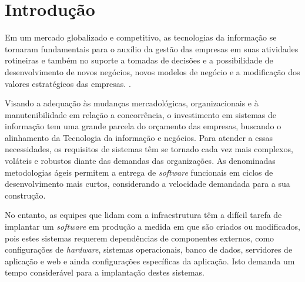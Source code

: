\section{\esp Introdução}

Em um mercado globalizado e competitivo, as tecnologias da informação se tornaram fundamentais para o auxílio da gestão das empresas em suas atividades rotineiras e também no suporte a tomadas de decisões e a possibilidade de desenvolvimento de novos negócios, novos modelos de negócio e a modificação dos valores estratégicos das empresas. \cite{audy}.

Visando a adequação às mudanças mercadológicas, organizacionais e à manutenibilidade em relação a concorrência, o investimento em sistemas de informação tem uma grande parcela do orçamento das empresas, buscando o alinhamento da Tecnologia da informação e negócios. \cite{luftman}  
Para atender a essas necessidades, os requisitos de sistemas têm se tornado cada vez mais complexos, voláteis e robustos diante das demandas das organizações. 
As denominadas metodologias ágeis permitem a entrega de \textit{software} funcionais em ciclos de desenvolvimento mais curtos, considerando a velocidade demandada para a sua construção. \cite{sbbrocco} 
          
No entanto, as equipes que lidam com a infraestrutura têm a difícil tarefa de implantar um \textit{software} em produção a medida em que são criados ou modificados, pois estes sistemas requerem dependências de componentes externos, como configurações de \textit{hardware}, sistemas operacionais, banco de dados, servidores de aplicação e web e ainda configurações específicas da aplicação. Isto demanda um tempo considerável para a implantação destes sistemas.


